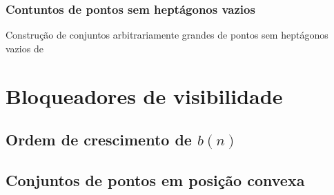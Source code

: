 \documentclass[a4paper]{book}
\begin{document}
\subsection{Contuntos de pontos sem heptágonos vazios}
Construção de conjuntos arbitrariamente grandes de pontos sem heptágonos vazios de \cite{heptagon}

\chapter{Bloqueadores de visibilidade}

\section{Ordem de crescimento de $b(n)$}
\cite{block,blockers}

\section{Conjuntos de pontos em posição convexa}
\cite{block,blockers}



{}
\end{document}
